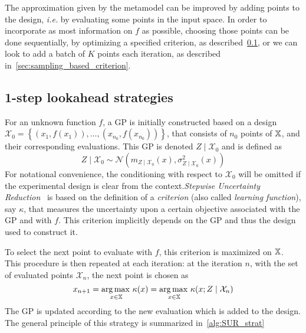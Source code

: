 \documentclass[../../Main_ManuscritThese.tex]{subfiles}
\begin{document}
The approximation given by the metamodel can be improved by adding
points to the design, \emph{i.e.} by evaluating some points in the
input space. In order to incorporate as most information on $f$ as
possible, choosing those points can be done sequentially, by
optimizing a specified criterion, as described~\cref{ssec:1stepSUR},
or we can look to add a batch of $K$ points each iteration, as
described in~\cref{sec:sampling_based_criterion}.




\subsection{1-step lookahead strategies}
\label{ssec:1stepSUR}
For an unknown function $f$, a GP is initially constructed based on a
design
$\mathcal{X}_0 = \left\{\left(x_1,f(x_1)\right), \dots, \left(x_{n_0},
    f(x_{n_0})\right)\right\}$, that consists of $n_0$ points of
$\mathbb{X}$, and their corresponding evaluations. This GP is denoted
$Z \mid \mathcal{X}_0$ and is defined as
\begin{equation}
  \label{eq:ZgivenXGP}
  Z\mid \mathcal{X}_0 \sim \mathcal{N}(m_{Z\mid\mathcal{X}_0}(x),\sigma^2_{Z\mid\mathcal{X}_0}(x))
\end{equation}
For notational convenience, the conditioning with respect to
$\mathcal{X}_0$ will be omitted if the experimental design is clear
from the context.\emph{Stepwise Uncertainty
  Reduction}~\cite{villemonteix_informational_2006} is based on the
definition of a \emph{criterion} (also called \emph{learning
  function}), say $\kappa$, that measures the uncertainty upon a
certain objective associated with the GP and with $f$. This criterion
implicitly depends on the GP and thus the design used to construct it.

To select the next point to evaluate with $f$, this criterion is maximized on $\mathbb{X}$.
This procedure is then repeated at each iteration: at the iteration $n$, with the set of evaluated points $\mathcal{X}_n$, the next point is chosen as
\begin{equation}
  x_{n+1} = \operatorname*{arg\,max \,}_{x\in\mathbb{X}} \kappa(x) = \operatorname*{arg\,max \,}_{x\in\mathbb{X}} \kappa(x; Z \mid \mathcal{X}_n)
\end{equation}
The GP is updated according to the new evaluation which is added to the design. The general principle of this strategy is summarized in~\cref{alg:SUR_strat}
\end{document}

